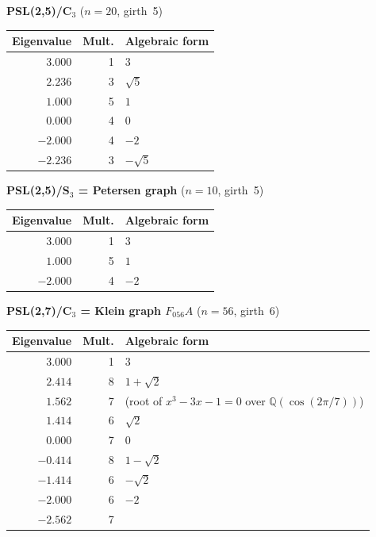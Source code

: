\documentclass[11pt,a4paper]{article}
\theoremstyle{plain}
\theoremstyle{definition}
\theoremstyle{remark}
\newcommand{\Q}{\mathbb{Q}}
\begin{document}
\begin{tcolorbox}[breakable, colback=black!5, colframe=black!5,
  boxrule=0pt, sharp corners]

\noindent\textbf{PSL(2,5)/C$_3$} \quad ($n=20$, girth~5)
\smallskip

\begin{center}
\begin{tabular}{rrl}
\toprule
Eigenvalue & Mult. & Algebraic form \\
\midrule
$3.000$ & 1 & $3$ \\
$2.236$ & 3 & $\sqrt{5}$ \\
$1.000$ & 5 & $1$ \\
$0.000$ & 4 & $0$ \\
$-2.000$ & 4 & $-2$ \\
$-2.236$ & 3 & $-\sqrt{5}$ \\
\bottomrule
\end{tabular}
\end{center}

\bigskip\noindent\textbf{PSL(2,5)/S$_3$ = Petersen graph} \quad ($n=10$, girth~5)
\smallskip

\begin{center}
\begin{tabular}{rrl}
\toprule
Eigenvalue & Mult. & Algebraic form \\
\midrule
$3.000$ & 1 & $3$ \\
$1.000$ & 5 & $1$ \\
$-2.000$ & 4 & $-2$ \\
\bottomrule
\end{tabular}
\end{center}

\bigskip\noindent\textbf{PSL(2,7)/C$_3$ = Klein graph $F_{056}A$} \quad ($n=56$, girth~6)
\smallskip

\begin{center}
\begin{tabular}{rrl}
\toprule
Eigenvalue & Mult. & Algebraic form \\
\midrule
$3.000$ & 1 & $3$ \\
$2.414$ & 8 & $1+\sqrt{2}$ \\
$1.562$ & 7 & (root of $x^3 - 3x - 1 = 0$ over $\Q(\cos(2\pi/7))$) \\
$1.414$ & 6 & $\sqrt{2}$ \\
$0.000$ & 7 & $0$ \\
$-0.414$ & 8 & $1-\sqrt{2}$ \\
$-1.414$ & 6 & $-\sqrt{2}$ \\
$-2.000$ & 6 & $-2$ \\
$-2.562$ & 7 & \\
\bottomrule
\end{tabular}
\end{center}


\end{tcolorbox}
\end{document}
